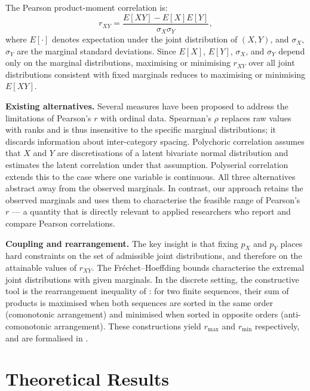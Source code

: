 \documentclass[
  12pt,
]{article}
\theoremstyle{plain}
\theoremstyle{definition}
\theoremstyle{remark}
\begin{document}
The Pearson product-moment correlation is: \[
r_{XY} = \frac{E[XY] - E[X]E[Y]}{\sigma_X \sigma_Y},
\] where \(E[\cdot]\) denotes expectation under the joint distribution
of \((X,Y)\), and \(\sigma_X\), \(\sigma_Y\) are the marginal standard
deviations. Since \(E[X]\), \(E[Y]\), \(\sigma_X\), and \(\sigma_Y\)
depend only on the marginal distributions, maximising or minimising
\(r_{XY}\) over all joint distributions consistent with fixed marginals
reduces to maximising or minimising \(E[XY]\).

\textbf{Existing alternatives.} Several measures have been proposed to
address the limitations of Pearson's \(r\) with ordinal data. Spearman's
\(\rho\) \autocite{spea04-proof} replaces raw values with ranks and is
thus insensitive to the specific marginal distributions; it discards
information about inter-category spacing. Polychoric correlation
\autocite{olss79-maximum} assumes that \(X\) and \(Y\) are
discretisations of a latent bivariate normal distribution and estimates
the latent correlation under that assumption. Polyserial correlation
\autocite{olss79-maximum} extends this to the case where one variable is
continuous. All three alternatives abstract away from the observed
marginals. In contrast, our approach retains the observed marginals and
uses them to characterise the feasible range of Pearson's \(r\) --- a
quantity that is directly relevant to applied researchers who report and
compare Pearson correlations.

\textbf{Coupling and rearrangement.} The key insight is that fixing
\(p_X\) and \(p_Y\) places hard constraints on the set of admissible
joint distributions, and therefore on the attainable values of
\(r_{XY}\). The Fréchet--Hoeffding bounds
\autocite{frec51-tableaux,hoef40-masstabinvariante} characterise the
extremal joint distributions with given marginals. In the discrete
setting, the constructive tool is the rearrangement inequality of
\textcite{hard52-inequalities}: for two finite sequences, their sum of
products is maximised when both sequences are sorted in the same order
(comonotonic arrangement) and minimised when sorted in opposite orders
(anti-comonotonic arrangement). These constructions yield \(r_{\max}\)
and \(r_{\min}\) respectively, and are formalised in
.

\section{Theoretical Results}\label{sec-theory}
\end{document}
